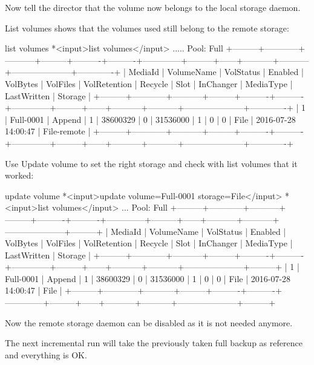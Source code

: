 Now tell the director that the volume now belongs to the local storage daemon. 

List volumes shows that the volumes used still belong to the remote storage:

\begin{bconsole}{list volumes}
*<input>list volumes</input>
.....
Pool: Full
+---------+------------+-----------+---------+----------+----------+--------------+---------+------+-----------+-----------+---------------------+-------------+
| MediaId | VolumeName | VolStatus | Enabled | VolBytes | VolFiles | VolRetention | Recycle | Slot | InChanger | MediaType | LastWritten         | Storage     |
+---------+------------+-----------+---------+----------+----------+--------------+---------+------+-----------+-----------+---------------------+-------------+
| 1       | Full-0001  | Append    | 1       | 38600329 | 0        | 31536000     | 1       | 0    | 0         | File      | 2016-07-28 14:00:47 | File-remote |
+---------+------------+-----------+---------+----------+----------+--------------+---------+------+-----------+-----------+---------------------+-------------+
\end{bconsole}

Use Update volume to set the right storage and check with list volumes that it worked:
\begin{bconsole}{update volume}
*<input>update volume=Full-0001 storage=File</input>
*<input>list volumes</input>
...
Pool: Full
+---------+------------+-----------+---------+----------+----------+--------------+---------+------+-----------+-----------+---------------------+---------+
| MediaId | VolumeName | VolStatus | Enabled | VolBytes | VolFiles | VolRetention | Recycle | Slot | InChanger | MediaType | LastWritten         | Storage |
+---------+------------+-----------+---------+----------+----------+--------------+---------+------+-----------+-----------+---------------------+---------+
| 1       | Full-0001  | Append    | 1       | 38600329 | 0        | 31536000     | 1       | 0    | 0         | File      | 2016-07-28 14:00:47 | File    |
+---------+------------+-----------+---------+----------+----------+--------------+---------+------+-----------+-----------+---------------------+---------+
\end{bconsole}

Now the remote storage daemon can be disabled as it is not needed anymore.

The next incremental run will take the previously taken full backup as reference and everything is OK.


